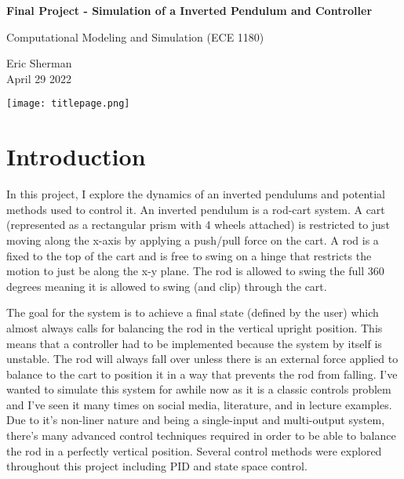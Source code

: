 \documentclass{article}
\begin{document}
\begin{titlepage}
    \begin{center}
        \vspace*{1cm}
            
        \LARGE
        \textbf{Final Project - Simulation of a Inverted Pendulum and Controller}
            
        \vspace{0.5cm}
        \Large
        Computational Modeling and Simulation (ECE 1180)
        
            
        \vspace{0.5cm}
        \large
        Eric Sherman \\
        April 29 2022
        
        \vspace{3cm}
        \texttt{[image: titlepage.png]}
            
        \vfill
        
    \end{center}
\end{titlepage}


\tableofcontents
\vfill


\section{Introduction}

In this project, I explore the dynamics of an inverted pendulums and potential methods used to control it. An inverted pendulum is a rod-cart system. A cart (represented as a rectangular prism with 4 wheels attached) is restricted to just moving along the x-axis by applying a push/pull force on the cart. A rod is a fixed to the top of the cart and is free to swing on a hinge that restricts the motion to just be along the x-y plane. The rod is allowed to swing the full 360 degrees meaning it is allowed to swing (and clip) through the cart.

The goal for the system is to achieve a final state (defined by the user) which almost always calls for balancing the rod in the vertical upright position. This means that a controller had to be implemented because the system by itself is unstable. The rod will always fall over unless there is an external force applied to balance to the cart to position it in a way that prevents the rod from falling. I've wanted to simulate this system for awhile now as it is a classic controls problem and I've seen it many times on social media, literature, and in lecture examples. Due to it's non-liner nature and being a single-input and multi-output system, there's many advanced control techniques required in order to be able to balance the rod in a perfectly vertical position. Several control methods were explored throughout this project including PID and state space control. 
\end{document}

